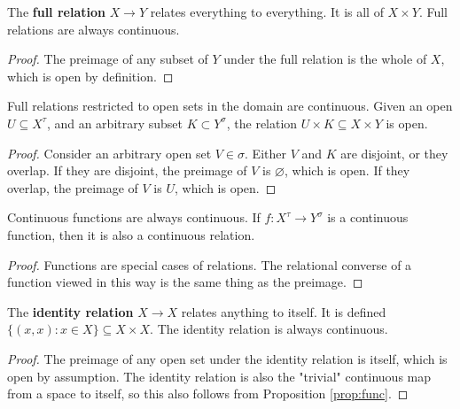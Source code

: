\begin{proposition}\label{prop:fullrel}
The \textbf{full relation} $X \rightarrow Y$ relates everything to everything. It is all of $X \times Y$. Full relations are always continuous.
\begin{proof}
The preimage of any subset of $Y$ under the full relation is the whole of $X$, which is open by definition.
\end{proof}
\end{proposition}

\begin{proposition}\label{prop:bowtie}
Full relations restricted to open sets in the domain are continuous. Given an open $U \subseteq X^\tau$, and an arbitrary subset $K \subset Y^\sigma$, the relation $U \times K \subseteq X \times Y$ is open.
\begin{proof}
Consider an arbitrary open set $V \in \sigma$. Either $V$ and $K$ are disjoint, or they overlap. If they are disjoint, the preimage of $V$ is $\varnothing$, which is open. If they overlap, the preimage of $V$ is $U$, which is open.
\end{proof}
\end{proposition}

\begin{proposition}\label{prop:func}
Continuous functions are always continuous. If $f: X^\tau \rightarrow Y^\sigma$ is a continuous function, then it is also a continuous relation.
\begin{proof}
Functions are special cases of relations. The relational converse of a function viewed in this way is the same thing as the preimage.
\end{proof}
\end{proposition}

\begin{proposition}\label{prop:idrel}
The \textbf{identity relation} $X \rightarrow X$ relates anything to itself. It is defined $\{(x,x) : x \in X\} \subseteq X \times X$. The identity relation is always continuous.
\begin{proof}
The preimage of any open set under the identity relation is itself, which is open by assumption. The identity relation is also the "trivial" continuous map from a space to itself, so this also follows from Proposition \ref{prop:func}.
\end{proof}
\end{proposition}